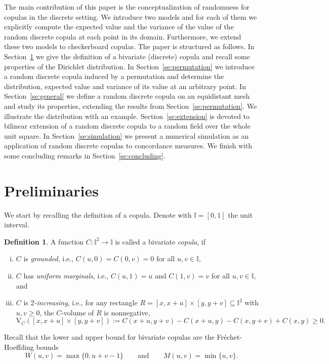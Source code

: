 \documentclass[12pt,a4paper]{amsart}
\theoremstyle{definition}
\newtheorem{definition}[theorem]{Definition}
\newcommand{\II}{\mathbb{I}}
\newcommand{\vol}{\mathrm{V}}
\begin{document}
The main contribution of this paper is the conceptualization of randomness for copulas in the discrete setting. We introduce two models and for each of them we explicitly compute the expected value and the variance of the value of the random discrete copula at each point in its domain. Furthermore, we extend these two models to checkerboard copulas.
The paper is structured as follows. In Section~\ref{se:prelim} we give the definition of a bivariate (discrete) copula and recall some properties of the Dirichlet distribution. 
In Section~\ref{se:permutation} we introduce a random discrete copula induced by a permutation and determine the distribution, expected value and variance of its value at an arbitrary point. 
In Section~\ref{se:general} we define a random discrete copula on an equidistant mesh and study its properties, extending the results from Section~\ref{se:permutation}. We illustrate the distribution with an example.
Section~\ref{se:extension} is devoted to bilinear extension of a random discrete copula to a random field over the whole unit square.
In Section~\ref{se:simulation} we present a numerical simulation as an application of random discrete copulas to concordance measures.
We finish with some concluding remarks in Section~\ref{se:concluding}.

\section{Preliminaries} \label{se:prelim}


We start by recalling the definition of a copula. Denote with $\II=[0,1]$ the unit interval.

\begin{definition}
A function  $C\colon\II^2\to\II$ is called a bivariate \emph{copula}, if
\begin{enumerate}[(i)]
    \item $C$ is \emph{grounded}, i.e., $C(u, 0)=C(0, v)=0$ for all $u, v \in \II$,
    \item $C$ has \emph{uniform marginals}, i.e., $C(u, 1)=u$ and $C(1, v)=v$ for all $u, v \in \II$, and
    \item $C$ is \emph{$2$-increasing}, i.e., for any rectangle $R=[x,x+u]\times[y,y+v] \subseteq\II^2$ with $u,v\ge 0$, the $C$-volume of $R$ is nonnegative, 
$$\vol_C ([x,x+u]\times[y,y+v]) := C(x+u,y+v) - C(x+u,y) - C(x,y+v) + C(x,y) \ge 0.$$
\end{enumerate}
\end{definition}
Recall that the lower and upper bound for bivariate copulas are the Fr\'{e}chet-Hoeffding bounds
$$W(u,v)=\max \{0,u+v-1\} \qquad \text{and} \qquad M(u,v)=\min \{u,v \}.$$
\end{document}
